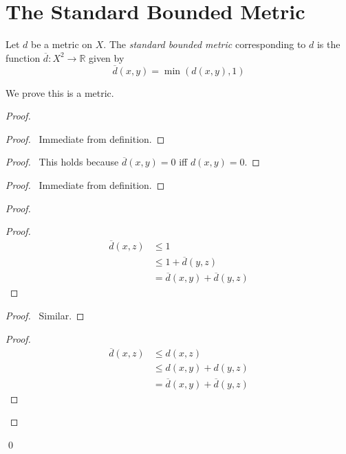 \section{The Standard Bounded Metric}

\begin{df}
  Let $d$ be a metric on $X$. The \emph{standard bounded metric} corresponding to $d$ is the function $\overline{d} : X^2 \rightarrow \mathbb{R}$ given by
  \[ \overline{d}(x,y) = \min(d(x,y), 1) \]

  We prove this is a metric.
\end{df}

\begin{proof}
  \pf
  \begin{proof}
    \pf\ Immediate from definition.
  \end{proof}
  \begin{proof}
    \pf\ This holds because $\overline{d}(x,y) = 0$ iff $d(x,y) = 0$.
  \end{proof}
  \begin{proof}
    \pf\ Immediate from definition.
  \end{proof}
  \begin{proof}
    \begin{proof}
      \pf
      \begin{align*}
        \overline{d}(x,z) & \leq 1 \\
        & \leq 1 + \overline{d}(y, z) \\
        & = \overline{d}(x,y) + \overline{d}(y, z)
      \end{align*}
    \end{proof}
    \begin{proof}
      \pf\ Similar.
    \end{proof}
    \begin{proof}
      \pf
      \begin{align*}
        \overline{d}(x,z) & \leq d(x,z) \\
        & \leq d(x,y) + d(y,z) \\
        & = \overline{d}(x,y) + \overline{d}(y,z)
      \end{align*}
    \end{proof}
  \end{proof}
  \qed
\end{proof}

